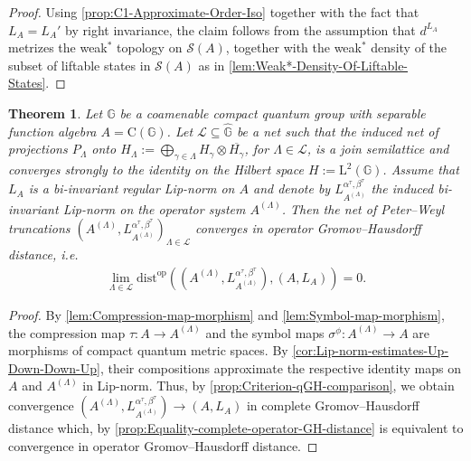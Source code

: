 \documentclass{amsart}
\theoremstyle{plain}
\newtheorem{theorem}{Theorem}[section]
\theoremstyle{definition}
\theoremstyle{remark}
\begin{document}
	\begin{proof}
		Using \autoref{prop:C1-Approximate-Order-Iso} together with the fact that $L_A = L_A'$ by right invariance, the claim follows from the assumption that $d^{L_A}$ metrizes the weak$^*$ topology on $\mathcal{S}(A)$, together with the weak$^*$ density of the subset of liftable states in $\mathcal{S}(A)$ as in \autoref{lem:Weak*-Density-Of-Liftable-States}. 
	\end{proof}
	
	\begin{theorem}\label{thm:Convergence-PW-truncations}
		Let $\mathbb{G}$ be a coamenable compact quantum group with separable function algebra $A = \mathrm{C}(\mathbb{G})$.
		Let $\mathcal{L} \subseteq \widehat{\mathbb{G}}$ be a net such that
		the induced net of projections $P_\Lambda$ onto $H_\Lambda := \bigoplus_{\gamma \in \Lambda} H_\gamma \otimes \overline{H_\gamma}$, for $\Lambda \in \mathcal{L}$, is a join semilattice and converges strongly to the identity on the Hilbert space $H := \mathrm{L}^2(\mathbb{G})$.
		Assume that $L_A$ is a bi-invariant regular Lip-norm on $A$ and denote by $L_{A^{(\Lambda)}}^{\alpha^\tau,\beta^\tau}$ the induced bi-invariant Lip-norm on the operator system $A^{(\Lambda)}$.
		Then the net of Peter--Weyl truncations $(A^{(\Lambda)},L_{A^{(\Lambda)}}^{\alpha^\tau,\beta^\tau})_{\Lambda \in \mathcal{L}}$ converges in operator Gromov--Hausdorff distance, i.e.
		\begin{align}
			\lim_{\Lambda \in \mathcal{L}} \mathrm{dist}^\mathrm{op}\left((A^{(\Lambda)},L_{A^{(\Lambda)}}^{\alpha^\tau,\beta^\tau}),(A,L_A)\right) = 0.
		\end{align}
	\end{theorem}
	
	\begin{proof}
		By \autoref{lem:Compression-map-morphism} and \autoref{lem:Symbol-map-morphism}, the compression map $\tau : A \rightarrow A^{(\Lambda)}$ and the symbol maps $\sigma^\phi : A^{(\Lambda)} \rightarrow A$ are morphisms of compact quantum metric spaces.
		By \autoref{cor:Lip-norm-estimates-Up-Down-Down-Up}, their compositions approximate the respective identity maps on $A$ and $A^{(\Lambda)}$ in Lip-norm.
		Thus, by \autoref{prop:Criterion-qGH-comparison}, we obtain convergence $(A^{(\Lambda)},L_{A^{(\Lambda)}}^{\alpha^\tau,\beta^\tau}) \rightarrow (A,L_A)$ in complete Gromov--Hausdorff distance which, by \autoref{prop:Equality-complete-operator-GH-distance} is equivalent to convergence in operator Gromov--Hausdorff distance.
	\end{proof}
	
\end{document}
